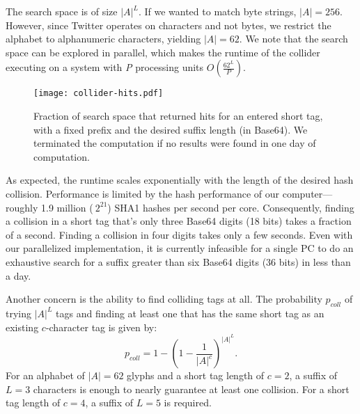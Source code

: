 The search space is of size $|A|^L$. If we wanted to match byte strings,
$|A| = 256$. However, since Twitter operates on characters and not
bytes, we restrict the alphabet to alphanumeric characters, yielding
$|A| = 62$. We note that the search space can be explored in parallel,
which makes the runtime of the collider executing on a system with
\textit{P} processing units $O(\frac{62^L}{P})$.

\begin{figure}
\begin{center}
\texttt{[image: collider-hits.pdf]}
\caption{Fraction of search space that returned hits for an entered short
  tag, with a fixed prefix and the desired suffix length (in
  Base64). We terminated the computation if no results were found in
  one day of computation.\label{fig:collider-hits}}
\end{center}
\end{figure}
\fi


As expected, the runtime
scales exponentially with the length
of the desired hash collision.
Performance is limited by the hash performance of our computer---
roughly 1.9 million ($~2^{21}$) SHA1 hashes per second per core.
Consequently, finding a collision in a short tag that's only three
Base64 digits (18 bits) takes a fraction of a second. Finding a
collision in four digits takes only a few seconds.
Even with our parallelized implementation, it is currently infeasible for a single PC to
do an exhaustive search for a suffix greater than six Base64
digits (36 bits) in less than a day.


Another concern is the ability to find colliding tags at all. The
probability $p_{coll}$ of trying $|A|^L$ tags and finding at least one
that has the same short tag as an existing $c$-character tag is given
by:
%
\[p_{coll} = 1-\left(1-\frac{1}{|A|^c}\right)^{|A|^L}.\]
%
For an alphabet of $|A|=62$ glyphs and a short tag length of $c=2$, a
suffix of $L=3$ characters is enough to nearly guarantee at least one
collision. For a short tag length of $c=4$, a suffix of $L=5$ is
required. 

